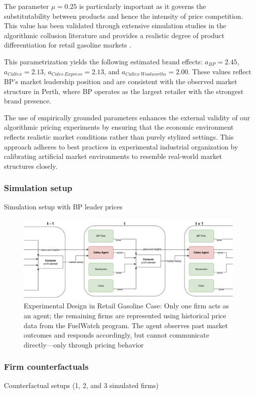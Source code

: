 The parameter $\mu = 0.25$ is particularly important as it governs the substitutability between products and hence the intensity of price competition. This value has been validated through extensive simulation studies in the algorithmic collusion literature and provides a realistic degree of product differentiation for retail gasoline markets \parencite{calvano_artificial_2020}.

This parametrization yields the following estimated brand effects: $a_{BP} = 2.45$, $a_{Caltex} = 2.13$, $a_{Coles\ Express} = 2.13$, and $a_{Caltex\ Woolworths} = 2.00$. These values reflect BP's market leadership position and are consistent with the observed market structure in Perth, where BP operates as the largest retailer with the strongest brand presence.

The use of empirically grounded parameters enhances the external validity of our algorithmic pricing experiments by ensuring that the economic environment reflects realistic market conditions rather than purely stylized settings. This approach adheres to best practices in experimental industrial organization by calibrating artificial market environments to resemble real-world market structures closely.

\subsubsection*{Simulation setup}
Simulation setup with BP leader prices

\begin{figure}
    \centering
    \includegraphics[width=1\linewidth]{latex//imgs/experimental_design_gasoline_industry.png}
    \caption{Experimental Design in Retail Gasoline Case: Only one firm acts as an agent; the remaining firms are represented using historical price data from the FuelWatch program. The agent observes past market outcomes and responds accordingly, but cannot communicate directly—only through pricing behavior}
    \label{fig:enter-label}
\end{figure}

\subsubsection*{Firm counterfactuals}
Counterfactual setups (1, 2, and 3 simulated firms)